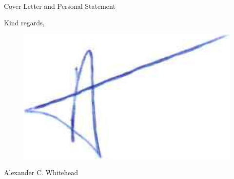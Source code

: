 \documentclass{cv}
\begin{document}
\begin{spacing}{1.4}
\begin{rSection}{Cover Letter and Personal Statement}
            \begin{spacing}{1.0}
                \begin{rSubsection}{}{}{}{}
                    \item Kind regards,
            
                    \item \begin{figure} [H]
                              \vspace{-0.2cm}
                              \hspace{1.0cm}\includegraphics[width=0.3\linewidth]{signature.png}
                              \vspace{-1.3cm}
                          \end{figure}
                    
                    \item Alexander C. Whitehead
                \end{rSubsection}
            \end{spacing}
        \end{rSection}
    \end{spacing}

    \newpage
\end{document}
